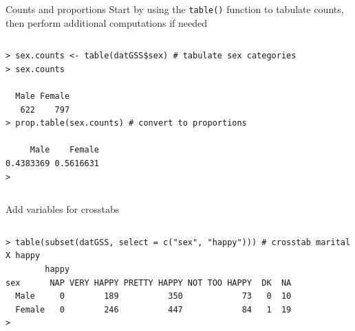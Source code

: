 \documentclass[table,smaller]{beamer}
\begin{document}
\begin{frame}[fragile,label=sec-7-2]{Counts and proportions}
 Start by using the \verb~table()~ function to tabulate counts, then perform additional computations if needed
\vspace{-.5em}
\begin{columns}
\begin{block}{}
\begin{verbatim}
> sex.counts <- table(datGSS$sex) # tabulate sex categories
> sex.counts

  Male Female 
   622    797 
> prop.table(sex.counts) # convert to proportions

     Male    Female 
0.4383369 0.5616631 
>
\end{verbatim}
\end{block}
\end{columns}
\vspace{.5em}

Add variables for crosstabs

\vspace{-.5em}
\begin{columns}
\begin{block}{}
\begin{verbatim}
> table(subset(datGSS, select = c("sex", "happy"))) # crosstab marital X happy
        happy
sex      NAP VERY HAPPY PRETTY HAPPY NOT TOO HAPPY  DK  NA
  Male     0        189          350            73   0  10
  Female   0        246          447            84   1  19
>
\end{verbatim}
\end{block}
\end{columns}
\vspace{.5em}
\end{frame}
\end{document}
